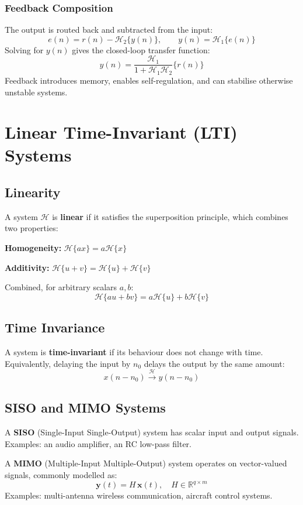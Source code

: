 \documentclass[11pt]{article}
\begin{document}
\subsubsection{Feedback Composition}
The output is routed back and subtracted from the input:
\[
  e(n) = r(n) - \mathcal{H}_2\{y(n)\}, \qquad y(n) = \mathcal{H}_1\{e(n)\}
\]
Solving for $y(n)$ gives the closed-loop transfer function:
\[
  y(n) = \frac{\mathcal{H}_1}{1 + \mathcal{H}_1 \mathcal{H}_2}\{r(n)\}
\]
Feedback introduces memory, enables self-regulation, and can stabilise otherwise unstable systems.

 
\section{Linear Time-Invariant (LTI) Systems}

\subsection{Linearity}

A system $\mathcal{H}$ is \textbf{linear} if it satisfies the superposition principle, which combines two properties:

\textbf{Homogeneity:} $\mathcal{H}\{ax\} = a\mathcal{H}\{x\}$

\textbf{Additivity:} $\mathcal{H}\{u + v\} = \mathcal{H}\{u\} + \mathcal{H}\{v\}$

Combined, for arbitrary scalars $a, b$:
\[
  \mathcal{H}\{au + bv\} = a\mathcal{H}\{u\} + b\mathcal{H}\{v\}
\]

\subsection{Time Invariance}

A system is \textbf{time-invariant} if its behaviour does not change with time. Equivalently, delaying the input by $n_0$ delays the output by the same amount:
\[
  x(n - n_0) \xrightarrow{\mathcal{H}} y(n - n_0)
\]

\subsection{SISO and MIMO Systems}

A \textbf{SISO} (Single-Input Single-Output) system has scalar input and output signals. Examples: an audio amplifier, an RC low-pass filter.

A \textbf{MIMO} (Multiple-Input Multiple-Output) system operates on vector-valued signals, commonly modelled as:
\[
  \mathbf{y}(t) = H\,\mathbf{x}(t), \quad H \in \mathbb{R}^{q \times m}
\]
Examples: multi-antenna wireless communication, aircraft control systems.
\end{document}
